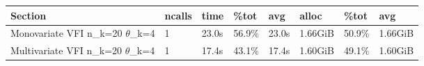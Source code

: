 \documentclass[
]{article}
\begin{document}
\begin{longtable}[]{@{}llllllll@{}}
\toprule
Section & ncalls & time & \%tot & avg & alloc & \%tot &
avg\tabularnewline
\midrule
\endhead
Monovariate VFI n\_k=20 \(\theta\)\_k=4 & 1 & 23.0s & 56.9\% & 23.0s &
1.66GiB & 50.9\% & 1.66GiB\tabularnewline
Multivariate VFI n\_k=20 \(\theta\)\_k=4 & 1 & 17.4s & 43.1\% & 17.4s &
1.60GiB & 49.1\% & 1.60GiB\tabularnewline
\bottomrule
\end{longtable}
\end{document}
